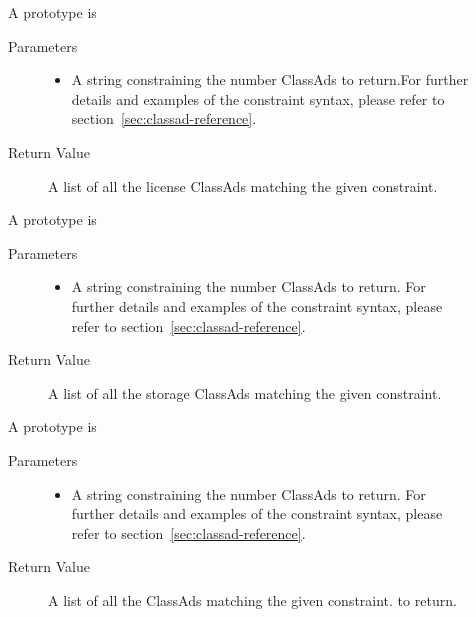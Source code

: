 \begin{description}
\item []
  A prototype is 


  \begin{description}
    \item[ Parameters]
    \begin{itemize}
      \item {} 
      A string constraining the number ClassAds to return.For further details 
      and examples of the constraint syntax, please refer to 
      section~\ref{sec:classad-reference}.
    \end{itemize}
    \item[ Return Value]
      A list of all the license ClassAds matching the given constraint.
  \end{description}
  
\item []
  A prototype is 


  \begin{description}
    \item[ Parameters]
    \begin{itemize}
      \item {}
      A string constraining the number ClassAds to return. For further details 
      and examples of the constraint syntax, please refer to 
      section~\ref{sec:classad-reference}.
    \end{itemize}
    \item[ Return Value]
      A list of all the storage ClassAds matching the given constraint.
  \end{description} 

\item []
  A prototype is 

  
  \begin{description}
    \item[ Parameters]
    \begin{itemize}
      \item {} 
      A string constraining the number ClassAds to return. For further details 
      and examples of the constraint syntax, please refer to 
      section~\ref{sec:classad-reference}.
    \end{itemize}
    \item[ Return Value]
      A list of all the ClassAds matching the given constraint.
      to return.
  \end{description}  

\end{description}

